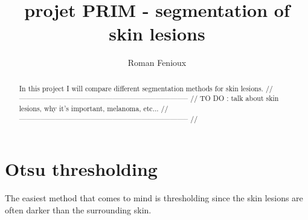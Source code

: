 \documentclass[a4paper,10pt]{article}
\title{projet PRIM - segmentation of skin lesions}
\author{Roman Fenioux}
\begin{document}
\maketitle

\begin{abstract}
In this project I will compare different segmentation methods for skin lesions. //
----------------------------------------------------------------------- //
 TO DO : talk about skin lesions, why it's important, melanoma, etc... //
----------------------------------------------------------------------- //
\end{abstract}

\section{Otsu thresholding}
The easiest method that comes to mind is thresholding since the skin lesions are often darker than the surrounding skin. 
\end{document}
